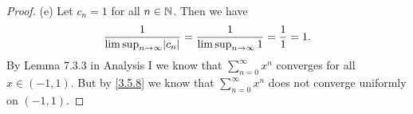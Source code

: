 \begin{proof}{(e)}
  Let \(c_n = 1\) for all \(n \in \mathbb{N}\).
  Then we have
  \[
    \frac{1}{\limsup_{n \to \infty} \abs{c_n}} = \frac{1}{\limsup_{n \to \infty} 1} = \frac{1}{1} = 1.
  \]
  By Lemma 7.3.3 in Analysis I we know that \(\sum_{n = 0}^\infty x^n\) converges for all \(x \in (-1, 1)\).
  But by \cref{3.5.8} we know that \(\sum_{n = 0}^\infty x^n\) does not converge uniformly on \((-1, 1)\).
\end{proof}